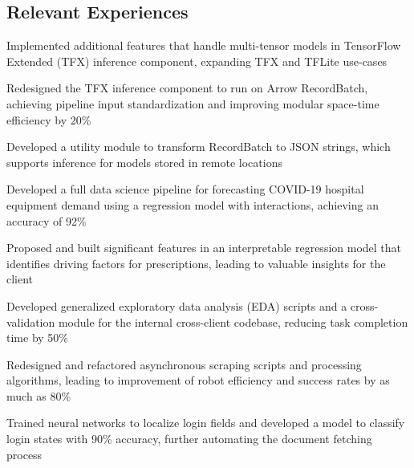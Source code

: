 \documentclass{mxresume}
\begin{document}
\begin{minipage}[t]{0.73\textwidth}
\begin{resumebody}
\begin{large}
%
\section*{Relevant Experiences}
%
\begin{tightemize}{5mm}
\item Implemented additional features that handle multi-tensor models in TensorFlow Extended (TFX) inference component, expanding TFX and TFLite use-cases
\item Redesigned the TFX inference component to run on Arrow RecordBatch, achieving pipeline input standardization and improving modular space-time efficiency by 20\textsc{\%}
\item Developed a utility module to transform RecordBatch to JSON strings, which supports inference for models stored in remote locations
\end{tightemize}
%
%
\begin{tightemize}{5mm}
\item Developed a full data science pipeline for forecasting COVID-19 hospital equipment demand using a regression model with interactions, achieving an accuracy of 92\textsc{\%}
\item Proposed and built significant features in an interpretable regression model that identifies driving factors for prescriptions, leading to valuable insights for the client
\item Developed generalized exploratory data analysis (EDA) scripts and a cross-validation module for the internal cross-client codebase, reducing task completion time by 50\textsc{\%}
\end{tightemize}
%
%
\begin{tightemize}{5mm}
\item Redesigned and refactored asynchronous scraping scripts and processing algorithms, leading to improvement of robot efficiency and success rates by as much as 80\textsc{\%}
\item Trained neural networks to localize login fields and developed a model to classify login states with 90\textsc{\%} accuracy, further automating the document fetching process
\end{tightemize}
%
%

\end{large}
\end{resumebody}
\end{minipage}
\end{document}

